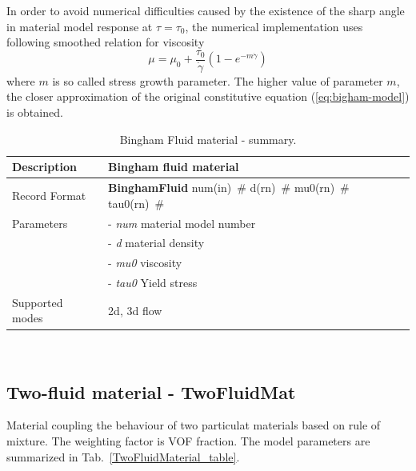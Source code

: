 \documentclass[a4paper]{article}
\newcommand{\descitem}[1]{{\noindent \bf #1}}
\newcommand{\elemparam}[2]{{{#1\tiny (#2)}~\#}}
\newcommand{\param}[1]{{\it #1}}
\newcommand{\del}[2]{\mbox{$\displaystyle\frac{#1}{#2}$}}
\newenvironment{mmt}{\begin{tabular}{|l|p{9cm}|}}{\end{tabular}\\}
\newenvironment{mmt}{\begin{tabular}{|l|l|}}{\end{tabular}\\}
\begin{document}
In order to avoid numerical difficulties caused by the existence of
the sharp angle in material model
response at $\tau=\tau_0$, the numerical implementation uses
following smoothed relation for viscosity
\begin{equation}
\label{eq:smooth-bigham-model}
\mu=\mu_0+\del{\tau_0}{\dot\gamma}(1-e^{-m\dot\gamma})
\end{equation}
where $m$ is so called stress growth parameter. The higher value of
parameter $m$, the closer approximation of the original
constitutive equation (\ref{eq:bigham-model}) is obtained.
%
%

\begin{table}[!htb]
\begin{mmt}
\hline
Description & Bingham fluid material\\
\hline
Record Format & \descitem{BinghamFluid} \elemparam{num}{in}
\elemparam{d}{rn} \elemparam{mu0}{rn} \elemparam{tau0}{rn}\\
Parameters &- \param{num} material model number\\
&- \param{d} material density\\
&- \param{mu0} viscosity\\
&- \param{tau0} Yield stress\\
Supported modes& 2d, 3d flow\\
\hline
\end{mmt}
\caption{Bingham Fluid material - summary.}
\label{BinghamFluidMaterial_table}
\end{table}



\subsection{Two-fluid material - TwoFluidMat}
\label{TwoFluidMaterial}
Material coupling the behaviour of two particulat materials based on
rule of mixture. The weighting factor is VOF fraction.
The model parameters are summarized in Tab.~\ref{TwoFluidMaterial_table}.
\end{document}
